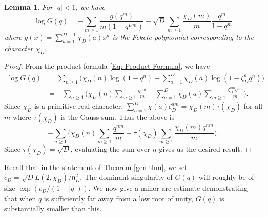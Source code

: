\documentclass[11pt]{amsart}
\numberwithin{equation}{section}
\newcommand{\mf}{\mathfrak}
\newtheorem{lem}[thm]{Lemma}
\theoremstyle{remark}
\begin{document}
\begin{lem}\label{lem 1} For $|q|<1$, we have 
\begin{equation}\label{log F}
\log G(q)
=
-\sum_{m\geq 1}\frac{g(q^m)}{m(1-q^{Dm})}
-\sqrt{D}\sum_{m\geq 1}\frac{\chi_D(m)}{m}\frac{q^m}{1-q^m}
\end{equation}
where $
g(x)=\sum_{a=1}^{D-1}\chi_D(a)x^a$
is the Fekete polynomial corresponding to the character $\chi_D$.
\end{lem}
\begin{proof} From the product formula \eqref{Eq: Product Formula}, we have 
  \begin{align*}
 \log G(q)
&=
  \sum_{n\geq 1} \bigg(\chi_D(n)\log(1-q^n)+\sum_{a=1}^D \chi_D(a)\log(1-\zeta_D^a q^n)\bigg)
  \\
&=
    -\sum_{n\geq 1} \bigg(\chi_D(n)\sum_{m\geq 1}\frac{q^{nm}}{m}+\sum_{a=1}^D \chi_D(a)\sum_{m\geq 1}\frac{\zeta_D^{am}q^{nm}}{m}\bigg).
  \end{align*}
Since $\chi_D$ is a primitive real character, $\sum_{a=1}^D \chi(a)\zeta_D^{am}=\chi_D(m)\tau(\chi_D)$ for all $m$ where $\tau(\chi_D)$ is the Gauss sum. Thus the above is 
   \begin{equation}\label{log prod}
    -\sum_{n\geq 1} \bigg(\chi_D(n)\sum_{m\geq 1}\frac{q^{nm}}{m}+\tau(\chi_D)\sum_{m\geq 1}\frac{\chi_D(m)q^{nm}}{m}\bigg).
     \end{equation} 
Since $\tau(\chi_D)=\sqrt{D}$, evaluating the sum over $n$ gives us the desired result.
\end{proof}
Recall that in the statement of Theorem \ref{gen thm}, we set $c_D =\sqrt{D}L(2,\chi_D)/\mf{n}_D^2$. The dominant singularity of $G(q)$ will roughly be of size $\exp(c_D/(1-|q|))$. We now give a minor arc estimate demonstrating that when $q$ is sufficiently far away from a low root of unity, $G(q)$ is substantially smaller than this. 
\end{document}

